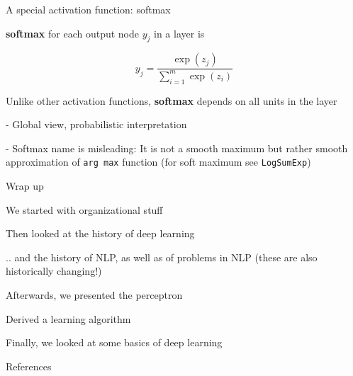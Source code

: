 \documentclass[12pt]{beamer}
\begin{document}
\begin{frame}{A special activation function: softmax}
	
\textbf{softmax} for each output node $y_j$ in a layer is

$$
y_j = \frac{\exp(z_j)}{\sum_{i = 1}^{m} \exp(z_i)}
$$

Unlike other activation functions, \textbf{softmax} depends on all units in the layer

- Global view, probabilistic interpretation
		
- Softmax name is misleading: It is not a smooth maximum but rather smooth approximation of \texttt{arg max} function (for soft maximum see \texttt{LogSumExp})


\end{frame}

\begin{frame}{Wrap up}
	
We started with organizational stuff

Then looked at the history of deep learning

.. and the history of NLP, as well as of problems in NLP (these are also historically changing!)

Afterwards, we presented the perceptron

Derived a learning algorithm

Finally, we looked at some basics of deep learning

\end{frame}

\begin{frame}[allowframebreaks]{References}

\printbibliography

%  
%  

\end{frame}
\end{document}
